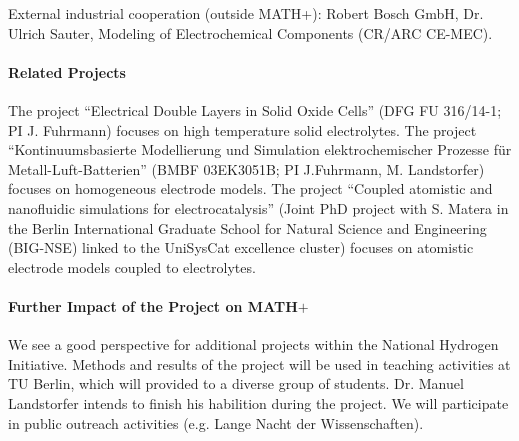 \documentclass[a4paper,10pt]{article}
\begin{document}
External industrial cooperation (outside MATH+): Robert Bosch GmbH, Dr. Ulrich Sauter, Modeling of Electrochemical Components (CR/ARC CE-MEC).

\paragraph{Related Projects}
The project ``Electrical Double Layers in Solid Oxide Cells'' (DFG FU 316/14-1; PI J. Fuhrmann) focuses
  on high temperature solid electrolytes.
The project  ``Kontinuumsbasierte Modellierung und Simulation elektrochemischer Prozesse für Metall-Luft-Batterien''
  (BMBF  03EK3051B; PI J.Fuhrmann, M. Landstorfer) focuses on homogeneous electrode models.
The project  ``Coupled atomistic and nanofluidic simulations for electrocatalysis'' (Joint PhD project with S. Matera
  in the  Berlin International Graduate School for Natural Science and Engineering (BIG-NSE) linked
  to the UniSysCat excellence cluster) focuses on atomistic electrode models coupled to electrolytes.


\paragraph{Further Impact of the Project on MATH$+$}
We see a good perspective for additional projects within the National Hydrogen Initiative. 
%
Methods and results of the project will be used in teaching activities at TU Berlin,
%
which will provided to a diverse group of students.
%
%
Dr. Manuel Landstorfer intends to finish his habilition during the project. %
%
We will participate in public outreach activities (e.g. Lange Nacht der Wissenschaften).
\end{document}

